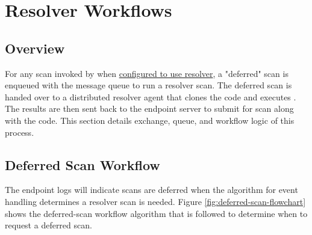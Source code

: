 \chapter{Resolver Workflows}\label{sec:resolver-workflows}

\section{Overview}
For any scan invoked by \cxoneflow\space when \hyperref[sec:resolver-elements]{configured to use resolver}, 
a "deferred" scan is enqueued with the message queue to run a resolver scan.  The deferred scan is handed over
to a distributed resolver agent that clones the code and executes \scaresolver.  The \scaresolver results are
then sent back to the \cxoneflow endpoint server to submit for scan along with the code.  This section details
exchange, queue, and workflow logic of this process.


\section{Deferred Scan Workflow}

The \cxoneflow endpoint logs will indicate scans are deferred when the algorithm for event handling
determines a resolver scan is needed.  Figure \ref{fig:deferred-scan-flowchart} shows the deferred-scan
workflow algorithm that is followed to determine when to request a deferred scan.  

